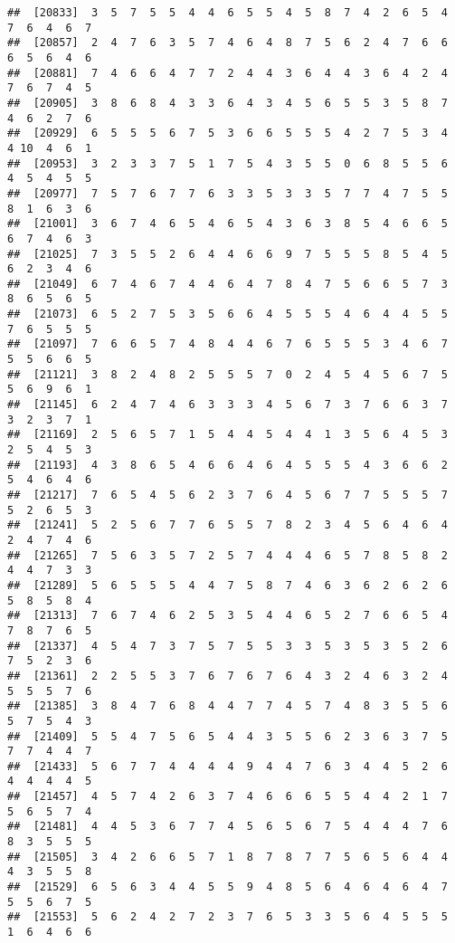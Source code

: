\documentclass[
]{book}
\begin{document}
\begin{verbatim}
##  [20833]  3  5  7  5  5  4  4  6  5  5  4  5  8  7  4  2  6  5  4  7  6  4  6  7
##  [20857]  2  4  7  6  3  5  7  4  6  4  8  7  5  6  2  4  7  6  6  6  5  6  4  6
##  [20881]  7  4  6  6  4  7  7  2  4  4  3  6  4  4  3  6  4  2  4  7  6  7  4  5
##  [20905]  3  8  6  8  4  3  3  6  4  3  4  5  6  5  5  3  5  8  7  4  6  2  7  6
##  [20929]  6  5  5  5  6  7  5  3  6  6  5  5  5  4  2  7  5  3  4  4 10  4  6  1
##  [20953]  3  2  3  3  7  5  1  7  5  4  3  5  5  0  6  8  5  5  6  4  5  4  5  5
##  [20977]  7  5  7  6  7  7  6  3  3  5  3  3  5  7  7  4  7  5  5  8  1  6  3  6
##  [21001]  3  6  7  4  6  5  4  6  5  4  3  6  3  8  5  4  6  6  5  6  7  4  6  3
##  [21025]  7  3  5  5  2  6  4  4  6  6  9  7  5  5  5  8  5  4  5  6  2  3  4  6
##  [21049]  6  7  4  6  7  4  4  6  4  7  8  4  7  5  6  6  5  7  3  8  6  5  6  5
##  [21073]  6  5  2  7  5  3  5  6  6  4  5  5  5  4  6  4  4  5  5  7  6  5  5  5
##  [21097]  7  6  6  5  7  4  8  4  4  6  7  6  5  5  5  3  4  6  7  5  5  6  6  5
##  [21121]  3  8  2  4  8  2  5  5  5  7  0  2  4  5  4  5  6  7  5  5  6  9  6  1
##  [21145]  6  2  4  7  4  6  3  3  3  4  5  6  7  3  7  6  6  3  7  3  2  3  7  1
##  [21169]  2  5  6  5  7  1  5  4  4  5  4  4  1  3  5  6  4  5  3  2  5  4  5  3
##  [21193]  4  3  8  6  5  4  6  6  4  6  4  5  5  5  4  3  6  6  2  5  4  6  4  6
##  [21217]  7  6  5  4  5  6  2  3  7  6  4  5  6  7  7  5  5  5  7  5  2  6  5  3
##  [21241]  5  2  5  6  7  7  6  5  5  7  8  2  3  4  5  6  4  6  4  2  4  7  4  6
##  [21265]  7  5  6  3  5  7  2  5  7  4  4  4  6  5  7  8  5  8  2  4  4  7  3  3
##  [21289]  5  6  5  5  5  4  4  7  5  8  7  4  6  3  6  2  6  2  6  5  8  5  8  4
##  [21313]  7  6  7  4  6  2  5  3  5  4  4  6  5  2  7  6  6  5  4  7  8  7  6  5
##  [21337]  4  5  4  7  3  7  5  7  5  5  3  3  5  3  5  3  5  2  6  7  5  2  3  6
##  [21361]  2  2  5  5  3  7  6  7  6  7  6  4  3  2  4  6  3  2  4  5  5  5  7  6
##  [21385]  3  8  4  7  6  8  4  4  7  7  4  5  7  4  8  3  5  5  6  5  7  5  4  3
##  [21409]  5  5  4  7  5  6  5  4  4  3  5  5  6  2  3  6  3  7  5  7  7  4  4  7
##  [21433]  5  6  7  7  4  4  4  4  9  4  4  7  6  3  4  4  5  2  6  4  4  4  4  5
##  [21457]  4  5  7  4  2  6  3  7  4  6  6  6  5  5  4  4  2  1  7  5  6  5  7  4
##  [21481]  4  4  5  3  6  7  7  4  5  6  5  6  7  5  4  4  4  7  6  8  3  5  5  5
##  [21505]  3  4  2  6  6  5  7  1  8  7  8  7  7  5  6  5  6  4  4  4  3  5  5  8
##  [21529]  6  5  6  3  4  4  5  5  9  4  8  5  6  4  6  4  6  4  7  5  5  6  7  5
##  [21553]  5  6  2  4  2  7  2  3  7  6  5  3  3  5  6  4  5  5  5  1  6  4  6  6

\end{verbatim}
\end{document}
